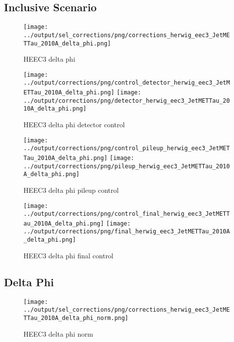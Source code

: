 \documentclass[11pt]{book}
\begin{document}
\subsection{Inclusive Scenario}
\begin{figure}[ht]
\centering
\texttt{[image: ../output/sel\_corrections/png/corrections\_herwig\_eec3\_JetMETTau\_2010A\_delta\_phi.png]}
\caption{HEEC3 delta phi}
\label{fig:HEEC3_JetMETTau_2010A_delta_phi}
\end{figure}

\begin{figure}[ht]
\centering
\texttt{[image: ../output/corrections/png/control\_detector\_herwig\_eec3\_JetMETTau\_2010A\_delta\_phi.png]}
\texttt{[image: ../output/corrections/png/detector\_herwig\_eec3\_JetMETTau\_2010A\_delta\_phi.png]}
\caption{HEEC3 delta phi detector control}
\label{fig:HEEC3_JetMETTau_2010A_delta_phi_detector_control}
\end{figure}

\begin{figure}[ht]
\centering
\texttt{[image: ../output/corrections/png/control\_pileup\_herwig\_eec3\_JetMETTau\_2010A\_delta\_phi.png]}
\texttt{[image: ../output/corrections/png/pileup\_herwig\_eec3\_JetMETTau\_2010A\_delta\_phi.png]}
\caption{HEEC3 delta phi pileup control}
\label{fig:HEEC3_JetMETTau_2010A_delta_phi_pileup_control}
\end{figure}


\begin{figure}[ht]
\centering
\texttt{[image: ../output/corrections/png/control\_final\_herwig\_eec3\_JetMETTau\_2010A\_delta\_phi.png]}
\texttt{[image: ../output/corrections/png/final\_herwig\_eec3\_JetMETTau\_2010A\_delta\_phi.png]}
\caption{HEEC3 delta phi final control}
\label{fig:HEEC3_JetMETTau_2010A_delta_phi_final_control}
\end{figure}

\subsection{Delta Phi}
\begin{figure}[ht]
\centering
\texttt{[image: ../output/sel\_corrections/png/corrections\_herwig\_eec3\_JetMETTau\_2010A\_delta\_phi\_norm.png]}
\caption{HEEC3 delta phi norm}
\label{fig:HEEC3_JetMETTau_2010A_delta_phi_norm}
\end{figure}
\end{document}
